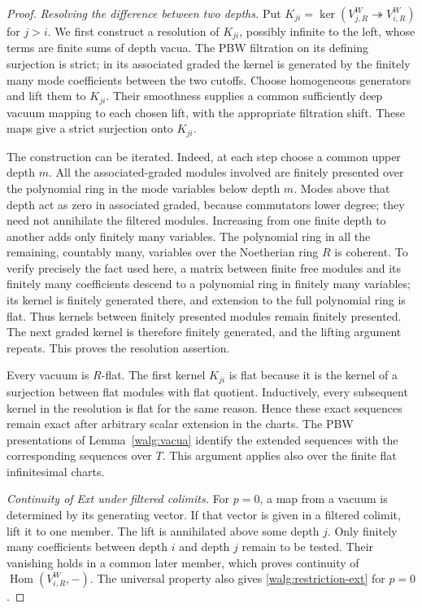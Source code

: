 \documentclass[11pt]{article}
\numberwithin{equation}{section}
\theoremstyle{definition}
\theoremstyle{remark}
\begin{document}
\begin{proof}
\emph{Resolving the difference between two depths.}
Put \(K_{ji}=\ker(V_{j,R}^W\twoheadrightarrow V_{i,R}^W)\) for
\(j>i\).  We first construct a resolution of \(K_{ji}\), possibly
infinite to the left, whose terms are finite sums of depth vacua.
The PBW filtration on its defining surjection is strict; in its
associated graded the kernel is generated by the finitely many mode
coefficients between the two cutoffs.  Choose homogeneous generators
and lift them to \(K_{ji}\).  Their smoothness supplies a common
sufficiently deep vacuum mapping to each chosen lift, with the
appropriate filtration shift.  These maps give a strict surjection
onto \(K_{ji}\).

The construction can be iterated.  Indeed, at each step choose a
common upper depth \(m\).  All the associated-graded modules involved
are finitely presented over the polynomial ring in the mode variables
below depth \(m\).  Modes above that depth act as zero in associated
graded, because commutators lower degree; they need not annihilate the
filtered modules.  Increasing from one finite depth to another adds
only finitely many variables.  The polynomial ring in all the
remaining, countably many, variables over the Noetherian ring \(R\)
is coherent.  To verify precisely the fact used here, a matrix between
finite free modules and its finitely many coefficients descend to a
polynomial ring in finitely many variables; its kernel is finitely
generated there, and extension to the full polynomial ring is flat.
Thus kernels between finitely presented modules remain finitely
presented.  The next graded kernel is therefore finitely generated,
and the lifting argument repeats.  This proves the resolution
assertion.

Every vacuum is \(R\)-flat.  The first kernel \(K_{ji}\) is flat
because it is the kernel of a surjection between flat modules with
flat quotient.  Inductively, every subsequent kernel in the resolution
is flat for the same reason.  Hence these exact sequences remain
exact after arbitrary scalar extension in the charts.  The PBW
presentations of Lemma~\ref{walg:vacua} identify the extended sequences
with the corresponding sequences over \(T\).  This argument applies
also over the finite flat infinitesimal charts.

\smallskip
\noindent\emph{Continuity of Ext under filtered colimits.}
For \(p=0\), a map from a vacuum is determined by its generating
vector.  If that vector is given in a filtered colimit, lift it to
one member.  The lift is annihilated above some depth \(j\).
Only finitely many coefficients between depth \(i\) and depth \(j\)
remain to be tested.  Their vanishing holds in a common later member,
which proves continuity of \(\operatorname{Hom}(V_{i,R}^W,-)\).
The universal property also gives \eqref{walg:restriction-ext} for
\(p=0\).


\end{proof}
\end{document}
